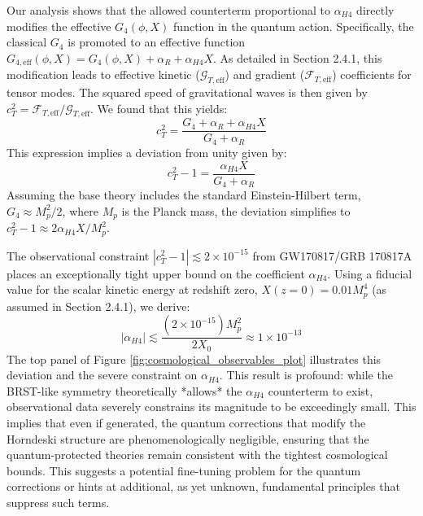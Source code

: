 \documentclass[twocolumn]{aastex631}
\begin{document}
Our analysis shows that the allowed counterterm proportional to $\alpha_{H4}$ directly modifies the effective $G_4(\phi, X)$ function in the quantum action. Specifically, the classical $G_4$ is promoted to an effective function $G_{4, \text{eff}}(\phi, X) = G_4(\phi, X) + \alpha_R + \alpha_{H4} X$. As detailed in Section 2.4.1, this modification leads to effective kinetic ($\mathcal{G}_{T, \text{eff}}$) and gradient ($\mathcal{F}_{T, \text{eff}}$) coefficients for tensor modes. The squared speed of gravitational waves is then given by $c_T^2 = \mathcal{F}_{T, \text{eff}} / \mathcal{G}_{T, \text{eff}}$. We found that this yields:
\begin{equation}
c_T^2 = \frac{G_4 + \alpha_R + \alpha_{H4} X}{G_4 + \alpha_R}
\label{eq:ct_squared}
\end{equation}
This expression implies a deviation from unity given by:
\begin{equation}
c_T^2 - 1 = \frac{\alpha_{H4} X}{G_4 + \alpha_R}
\label{eq:ct_deviation}
\end{equation}
Assuming the base theory includes the standard Einstein-Hilbert term, $G_4 \approx M_p^2/2$, where $M_p$ is the Planck mass, the deviation simplifies to $c_T^2 - 1 \approx 2 \alpha_{H4} X / M_p^2$.

The observational constraint $|c_T^2 - 1| \lesssim 2 \times 10^{-15}$ from GW170817/GRB 170817A places an exceptionally tight upper bound on the coefficient $\alpha_{H4}$. Using a fiducial value for the scalar kinetic energy at redshift zero, $X(z=0) = 0.01 M_p^4$ (as assumed in Section 2.4.1), we derive:
\begin{equation}
|\alpha_{H4}| \lesssim \frac{(2 \times 10^{-15}) M_p^2}{2 X_0} \approx 1 \times 10^{-13}
\label{eq:alpha_h4_constraint}
\end{equation}
The top panel of Figure \ref{fig:cosmological_observables_plot} illustrates this deviation and the severe constraint on $\alpha_{H4}$. This result is profound: while the BRST-like symmetry theoretically *allows* the $\alpha_{H4}$ counterterm to exist, observational data severely constrains its magnitude to be exceedingly small. This implies that even if generated, the quantum corrections that modify the Horndeski structure are phenomenologically negligible, ensuring that the quantum-protected theories remain consistent with the tightest cosmological bounds. This suggests a potential fine-tuning problem for the quantum corrections or hints at additional, as yet unknown, fundamental principles that suppress such terms.
\end{document}
